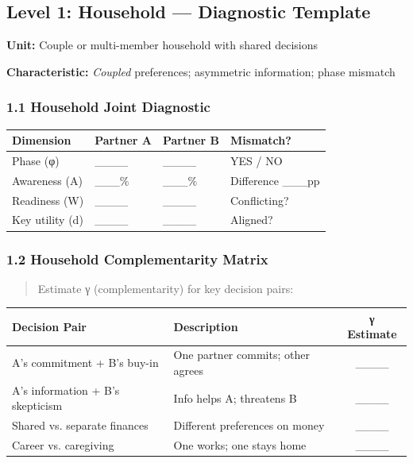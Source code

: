 \subsection*{Level 1: Household --- Diagnostic Template}

\textbf{Unit:} Couple or multi-member household with shared decisions

\textbf{Characteristic:} \emph{Coupled} preferences; asymmetric information; phase mismatch

\subsubsection*{1.1 Household Joint Diagnostic}

\begin{center}
\small
\begin{tabular}{@{}p{2cm}p{2cm}p{2cm}p{2cm}@{}}
\toprule
\textbf{Dimension} & \textbf{Partner A} & \textbf{Partner B} & \textbf{Mismatch?} \\
\midrule
Phase (φ) & \_\_\_\_ & \_\_\_\_ & YES / NO \\
Awareness (A) & \_\_\_\% & \_\_\_\% & Difference \_\_\_pp \\
Readiness (W) & \_\_\_\_ & \_\_\_\_ & Conflicting? \\
Key utility (d) & \_\_\_\_ & \_\_\_\_ & Aligned? \\
\midrule
\end{tabular}
\end{center}

\subsubsection*{1.2 Household Complementarity Matrix}

\begin{quote}
Estimate γ (complementarity) for key decision pairs:
\end{quote}

\begin{center}
\begin{tabular}{@{}llc@{}}
\toprule
\textbf{Decision Pair} & \textbf{Description} & \textbf{γ Estimate} \\
\midrule
A's commitment + B's buy-in & One partner commits; other agrees & \_\_\_\_ \\
A's information + B's skepticism & Info helps A; threatens B & \_\_\_\_ \\
Shared vs. separate finances & Different preferences on money & \_\_\_\_ \\
Career vs. caregiving & One works; one stays home & \_\_\_\_ \\
\midrule
\end{tabular}
\end{center}

